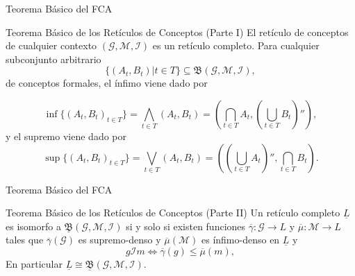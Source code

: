 \documentclass{beamer}
\newcommand{\M}{\mathcal{M}}
\newcommand{\I}{\mathcal{I}}
\newcommand{\G}{\mathcal{G}}
\begin{document}
\begin{frame}{Teorema Básico del FCA }
      \begin{block}{Teorema Básico de los Retículos de Conceptos (Parte I)}
      \justifying
      El retículo de conceptos de cualquier contexto $(\G,\M,\I)$ es un retículo completo. Para cualquier subconjunto arbitrario
    $$\{(A_t,B_t) | t\in T \} \subseteq\mathfrak{B}(\G,\M,\I),$$
    de conceptos formales, el ínfimo viene dado por
    
    \[
        \inf\{(A_{t}, B_{t})_{t \in T}\} = \bigwedge_{t\in T}(A_{t},B_{t})= (\bigcap_{t \in T}A_{t}, (\bigcup_{t \in T}B_{t})''),
    \]
    y el supremo viene dado por
    \[
        \sup\{(A_{t}, B_{t})_{t \in T}\} = \bigvee_{t\in T}(A_{t},B_{t})= ((\bigcup_{t \in T}A_{t})'', \bigcap_{t \in T}B_{t}).
    \]
    \end{block}
\end{frame}

    \begin{frame}{Teorema Básico del FCA }
    \begin{block}{Teorema Básico de los Retículos de Conceptos (Parte II)}
    \justifying
    Un retículo completo $\underline{L}$ es isomorfo a $\underline{\mathfrak{B}}(\G,\M,\I)$ si y solo si existen funciones $\overline{\gamma}:\G \to L$ y $\overline{\mu}:\M \to L$ tales que $\overline{\gamma}(\G)$ es supremo-denso y $\overline{\mu}(\M)$ es ínfimo-denso en $\underline{L}$ y $$g \I m \Longleftrightarrow \overline{\gamma}(g) \leq \overline{\mu}(m), $$
    En particular $\underline{L} \cong \underline{\mathfrak{B}}(\G,\M,\I).$
    \end{block}
  \end{frame}
\end{document}
